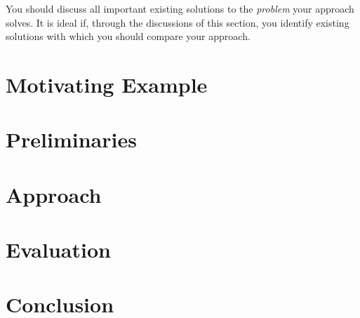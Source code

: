 You should discuss all important existing solutions to the \emph{problem} your approach solves.
It is ideal if, through the discussions of this section, you identify existing solutions with which you should compare your approach.

\section{Motivating Example}
\label{sec:motivating:example}

\section{Preliminaries}
\label{sec:preliminaries}

\section{Approach}
\label{sec:approach}

\section{Evaluation}
\label{sec:evaluation}

\section{Conclusion}
\label{sec:conclusion}



\appendix


\newpage
\listoftodos

